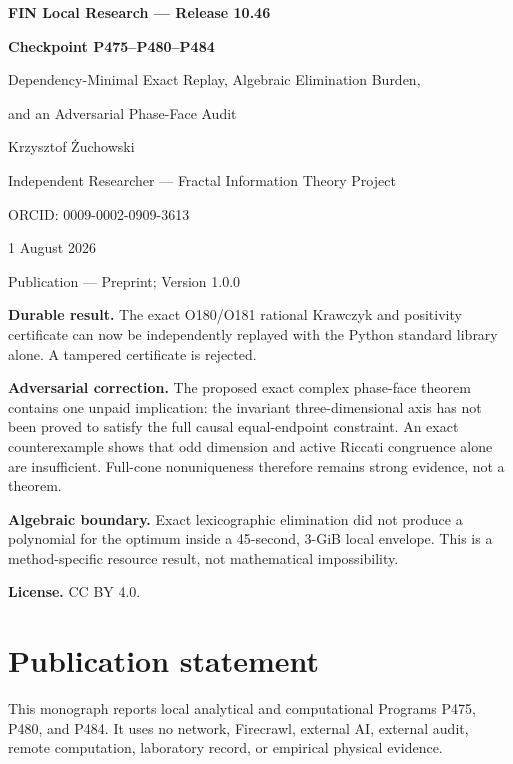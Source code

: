 \documentclass[11pt,a4paper,openany]{report}
\begin{document}
\hypersetup{pageanchor=false}
\begin{titlepage}\centering\vspace*{8mm}
{\Large\bfseries FIN Local Research --- Release 10.46\par}\vspace{10mm}
{\Huge\bfseries Checkpoint P475--P480--P484\par}\vspace{6mm}
{\Large Dependency-Minimal Exact Replay, Algebraic Elimination Burden,\par}
{\Large and an Adversarial Phase-Face Audit\par}\vspace{14mm}
{\Large Krzysztof \.Zuchowski\par}\vspace{2mm}
{\normalsize Independent Researcher --- Fractal Information Theory Project\par}
{\normalsize ORCID: 0009-0002-0909-3613\par}\vspace{8mm}
{\large 1 August 2026\par}
{\normalsize Publication --- Preprint; Version 1.0.0\par}
\vfill
\begin{minipage}{0.92\textwidth}\small
\textbf{Durable result.} The exact O180/O181 rational Krawczyk and positivity
certificate can now be independently replayed with the Python standard library
alone. A tampered certificate is rejected.

\medskip\textbf{Adversarial correction.} The proposed exact complex
phase-face theorem contains one unpaid implication: the invariant
three-dimensional axis has not been proved to satisfy the full causal
equal-endpoint constraint. An exact counterexample shows that odd dimension
and active Riccati congruence alone are insufficient. Full-cone nonuniqueness
therefore remains strong evidence, not a theorem.

\medskip\textbf{Algebraic boundary.} Exact lexicographic elimination did not
produce a polynomial for the optimum inside a 45-second, 3-GiB local envelope.
This is a method-specific resource result, not mathematical impossibility.

\medskip\textbf{License.} CC BY 4.0.
\end{minipage}\vfill
\end{titlepage}
\hypersetup{pageanchor=true}
\chapter*{Publication statement}
This monograph reports local analytical and computational Programs P475,
P480, and P484. It uses no network, Firecrawl, external AI, external audit,
remote computation, laboratory record, or empirical physical evidence.
\tableofcontents\clearpage{}
\end{document}
